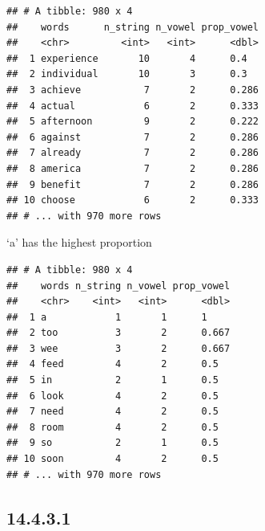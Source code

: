 \documentclass[]{book}
\newenvironment{Shaded}{\begin{snugshade}}{\end{snugshade}}
\newcommand{\KeywordTok}[1]{\textcolor[rgb]{0.13,0.29,0.53}{\textbf{#1}}}
\newcommand{\NormalTok}[1]{#1}
\newcommand{\OperatorTok}[1]{\textcolor[rgb]{0.81,0.36,0.00}{\textbf{#1}}}
\newcommand{\StringTok}[1]{\textcolor[rgb]{0.31,0.60,0.02}{#1}}
\theoremstyle{definition}
\theoremstyle{definition}
\theoremstyle{definition}
\theoremstyle{remark}
\begin{document}
\begin{enumerate}
\begin{verbatim}
## # A tibble: 980 x 4
##    words      n_string n_vowel prop_vowel
##    <chr>         <int>   <int>      <dbl>
##  1 experience       10       4      0.4  
##  2 individual       10       3      0.3  
##  3 achieve           7       2      0.286
##  4 actual            6       2      0.333
##  5 afternoon         9       2      0.222
##  6 against           7       2      0.286
##  7 already           7       2      0.286
##  8 america           7       2      0.286
##  9 benefit           7       2      0.286
## 10 choose            6       2      0.333
## # ... with 970 more rows
\end{verbatim}

  `a' has the highest proportion

\begin{Shaded}
\end{Shaded}

\begin{verbatim}
## # A tibble: 980 x 4
##    words n_string n_vowel prop_vowel
##    <chr>    <int>   <int>      <dbl>
##  1 a            1       1      1    
##  2 too          3       2      0.667
##  3 wee          3       2      0.667
##  4 feed         4       2      0.5  
##  5 in           2       1      0.5  
##  6 look         4       2      0.5  
##  7 need         4       2      0.5  
##  8 room         4       2      0.5  
##  9 so           2       1      0.5  
## 10 soon         4       2      0.5  
## # ... with 970 more rows
\end{verbatim}
\end{enumerate}

\hypertarget{section-47}{%
\subsection{14.4.3.1}\label{section-47}}
\end{document}
